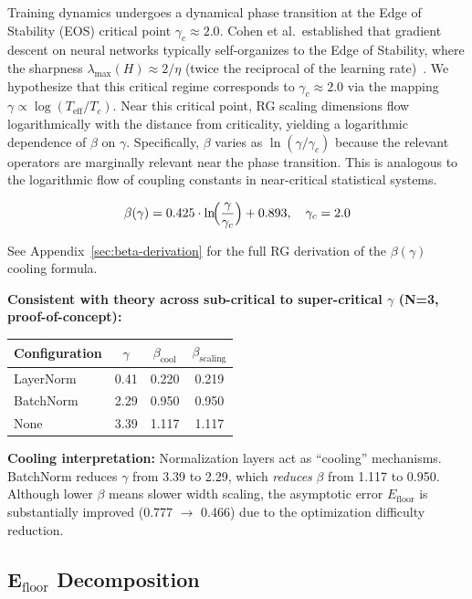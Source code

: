\documentclass[11pt, a4paper]{article}
\theoremstyle{plain}
\begin{document}
Training dynamics undergoes a dynamical phase transition at the Edge of Stability (EOS) critical point $\gamma_c \approx 2.0$. Cohen et al.\ established that gradient descent on neural networks typically self-organizes to the Edge of Stability, where the sharpness $\lambda_{\max}(H) \approx 2/\eta$ (twice the reciprocal of the learning rate)~\citep{cohen2021theory}. We hypothesize that this critical regime corresponds to $\gamma_c \approx 2.0$ via the mapping $\gamma \propto \log(T_{\mathrm{eff}}/T_c)$. Near this critical point, RG scaling dimensions flow logarithmically with the distance from criticality, yielding a logarithmic dependence of $\beta$ on $\gamma$. Specifically, $\beta$ varies as $\ln(\gamma/\gamma_c)$ because the relevant operators are marginally relevant near the phase transition. This is analogous to the logarithmic flow of coupling constants in near-critical statistical systems.

\begin{equation}
\beta(\gamma) = 0.425 \cdot \ln\!\Bigl(\frac{\gamma}{\gamma_c}\Bigr) + 0.893, \quad \gamma_c = 2.0
\end{equation}

See Appendix~\ref{sec:beta-derivation} for the full RG derivation of the $\beta(\gamma)$ cooling formula.

\textbf{Consistent with theory across sub-critical to super-critical $\gamma$ (N=3, proof-of-concept):}
\begin{center}
\begin{tabular}{lccc}
\toprule
Configuration & $\gamma$ & $\beta_{\mathrm{cool}}$ & $\beta_{\mathrm{scaling}}$ \\
\midrule
LayerNorm & 0.41 & 0.220 & 0.219 \\
BatchNorm & 2.29 & 0.950 & 0.950 \\
None & 3.39 & 1.117 & 1.117 \\
\bottomrule
\end{tabular}
\end{center}

\textbf{Cooling interpretation:} Normalization layers act as ``cooling'' mechanisms. BatchNorm reduces $\gamma$ from 3.39 to 2.29, which \emph{reduces} $\beta$ from 1.117 to 0.950. Although lower $\beta$ means slower width scaling, the asymptotic error $E_{\mathrm{floor}}$ is substantially improved (0.777 $\to$ 0.466) due to the optimization difficulty reduction.

\subsection{E$_{\mathrm{floor}}$ Decomposition}
\end{document}
